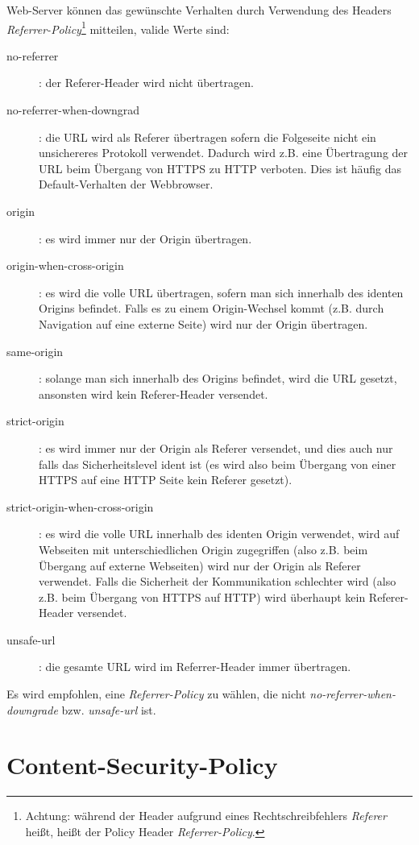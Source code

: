 Web-Server können das gewünschte Verhalten durch Verwendung des Headers \textit{Referrer-Policy}\footnote{Achtung: während der Header aufgrund eines Rechtschreibfehlers \textit{Referer} heißt, heißt der Policy Header \textit{Referrer-Policy}.} mitteilen, valide Werte sind:

\begin{description}
	\item[no-referrer]: der Referer-Header wird nicht übertragen.
	\item[no-referrer-when-downgrad]: die URL wird als Referer übertragen sofern die Folgeseite nicht ein unsichereres Protokoll verwendet. Dadurch wird z.B. eine Übertragung der URL beim Übergang von HTTPS zu HTTP verboten. Dies ist häufig das Default-Verhalten der Webbrowser.
	\item[origin]: es wird immer nur der Origin übertragen.
	\item[origin-when-cross-origin]: es wird die volle URL übertragen, sofern man sich innerhalb des identen Origins befindet. Falls es zu einem Origin-Wechsel kommt (z.B. durch Navigation auf eine externe Seite) wird nur der Origin übertragen.
	\item[same-origin]: solange man sich innerhalb des Origins befindet, wird die URL gesetzt, ansonsten wird kein Referer-Header versendet.
	\item[strict-origin]: es wird immer nur der Origin als Referer versendet, und dies auch nur falls das Sicherheitslevel ident ist (es wird also beim Übergang von einer HTTPS auf eine HTTP Seite kein Referer gesetzt).
	\item[strict-origin-when-cross-origin]: es wird die volle URL innerhalb des identen Origin verwendet, wird auf Webseiten mit unterschiedlichen Origin zugegriffen (also z.B. beim Übergang auf externe Webseiten) wird nur der Origin als Referer verwendet. Falls die Sicherheit der Kommunikation schlechter wird (also z.B. beim Übergang von HTTPS auf HTTP) wird überhaupt kein Referer-Header versendet.
	\item[unsafe-url]: die gesamte URL wird im Referrer-Header immer übertragen.
\end{description}

Es wird empfohlen, eine \textit{Referrer-Policy} zu wählen, die nicht \textit{no-referrer-when-downgrade} bzw. \textit{unsafe-url} ist.

\section{Content-Security-Policy}
\label{csp}

